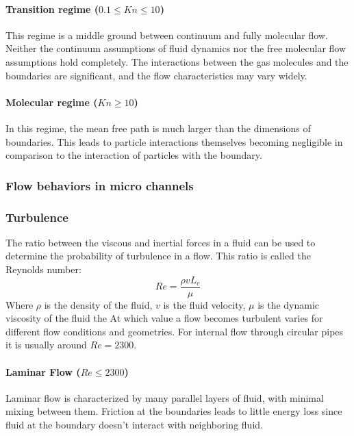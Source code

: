 \paragraph{Transition regime (\(0.1 \leq Kn \leq 10\))}
	
	This regime is a middle ground between continuum and fully molecular flow.
	Neither the continuum assumptions of fluid dynamics nor the free molecular flow assumptions hold completely.
	The interactions between the gas molecules and the boundaries are significant, and the flow characteristics may vary widely.

\paragraph{Molecular regime (\(Kn \geq 10\))}

	In this regime, the mean free path is much larger than the dimensions of boundaries.
	This leads to particle interactions themselves becoming negligible in comparison to the interaction of particles with the boundary.
	\cite{rapp2017microfluidics}

\subsubsection{Flow behaviors in micro channels}

	

\subsubsection{Turbulence}

	The ratio between the viscous and inertial forces in a fluid can be used to determine the probability of turbulence in a flow.
	This ratio is called the Reynolds number:
	$$
		Re = \frac{\rho v L_c}{\mu}
	$$
	Where  $\rho$ is the density of the fluid, $v$ is the fluid velocity, $\mu$ is the dynamic viscosity of the fluid the  At which value a flow becomes turbulent varies for different flow conditions and geometries. For internal flow through circular pipes it is usually around $Re = 2300$. \cite{Cengel2017}
	
\paragraph{Laminar Flow (\(Re \le 2300\))}

	Laminar flow is characterized by many parallel layers of fluid, with minimal mixing between them.
	Friction at the boundaries leads to little energy loss since fluid at the boundary doesn't interact with neighboring fluid.
	

